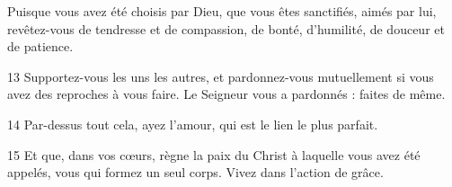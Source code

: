 Puisque vous avez été choisis par Dieu, que vous êtes sanctifiés, aimés par lui, revêtez-vous de tendresse et de compassion, de bonté, d’humilité, de douceur et de patience.

13 Supportez-vous les uns les autres, et pardonnez-vous mutuellement si vous avez des reproches à vous faire. Le Seigneur vous a pardonnés : faites de même.

14 Par-dessus tout cela, ayez l’amour, qui est le lien le plus parfait.

15 Et que, dans vos cœurs, règne la paix du Christ à laquelle vous avez été appelés, vous qui formez un seul corps. Vivez dans l’action de grâce.
